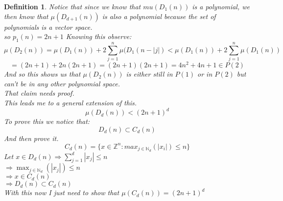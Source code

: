 \documentclass[12pt]{extarticle}
\theoremstyle{plain}
\theoremstyle{plain}
\theoremstyle{plain}
\theoremstyle{Definition}
\newtheorem{def.}{Definition}[section]
\theoremstyle{Definition}
\theoremstyle{plain}
\theoremstyle{plain}
\begin{document}
\begin{def.}
	Notice that since we know that $mu(D_1(n))$ is a polynomial, we then know that $\mu(D_{d+1}(n)) $ is also a polynomial because the set of polynomials is a vector space. \\
	so $p_1(n) = 2n + 1$
	Knowing this observe: \\ 
	$$\mu(D_{2}(n)) = \mu(D_1(n)) + 2 \sum_{j=1}^n \mu(D_{1}(n-|j|) < \mu(D_1(n)) + 2 \sum_{j=1}^n \mu(D_{1}(n)) $$
	$$= (2n+1) +  2n(2n+1)  = (2n+1)(2n+1) = 4n^2 + 4n + 1 \in P(2)$$
	And so this shows us that $\mu(D_{2}(n))$ is either still in $P(1)$ or in $P(2)$ but can't be in any other polynomial space. \\
	That claim needs proof. \\
	This leads me to a general extension of this. \\ 
	$$\mu(D_{d}(n)) < (2n+1)^d$$
	To prove this we notice that: 
	$$D_d(n) \subset C_d(n)$$
	And then prove it. \\ 
	$$C_d(n) = \{x \in \mathbb{Z}^n : max_{j\in \mathbb{N}_d}(|x_i|) \leq n\}$$
	Let $x \in D_d(n) \Rightarrow \sum_{j=1}^{d} |x_j| \leq n$ \\ 
	$\Rightarrow \max_{j \in \mathbb{N}_d}(|x_j|) \leq n$ \\ 
	$\Rightarrow x \in C_d(n)$ \\ 
	$\Rightarrow D_d(n) \subset C_d(n)$ \\ 
	With this now I just need to show that $\mu(C_d(n)) = (2n+1)^d$ \\ \\
	
	
	

\end{def.}
\end{document}

